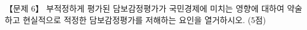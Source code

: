 \begin{longquestion}{【문제 6】}
부적정하게 평가된 담보감정평가가 국민경제에 미치는 영향에 대하여 약술하고 현실적으로 적정한 담보감정평가를 저해하는 요인을 열거하시오. (5점) \par
\end{longquestion}
